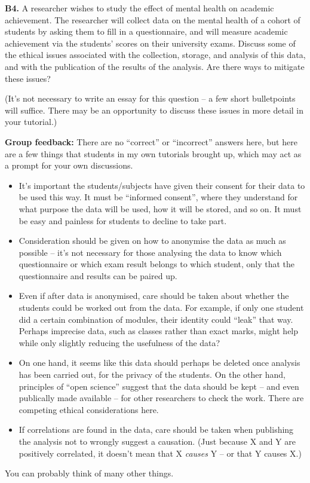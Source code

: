 \documentclass[
  a4paper,
]{book}
\providecommand{\tightlist}{%
  \setlength{\itemsep}{0pt}\setlength{\parskip}{0pt}}
\theoremstyle{definition}
\theoremstyle{definition}
\theoremstyle{definition}
\theoremstyle{definition}
\theoremstyle{remark}
\begin{document}
\textbf{B4.} A researcher wishes to study the effect of mental health on academic achievement. The researcher will collect data on the mental health of a cohort of students by asking them to fill in a questionnaire, and will measure academic achievement via the students' scores on their university exams. Discuss some of the ethical issues associated with the collection, storage, and analysis of this data, and with the publication of the results of the analysis. Are there ways to mitigate these issues?

(It's not necessary to write an essay for this question -- a few short bulletpoints will suffice. There may be an opportunity to discuss these issues in more detail in your tutorial.)

\begin{myanswers}
\textbf{Group feedback:} There are no ``correct'' or ``incorrect'' answers here, but here are a few things that students in my own tutorials brought up, which may act as a prompt for your own discussions.

\begin{itemize}
\tightlist
\item
  It's important the students/subjects have given their consent for their data to be used this way. It must be ``informed consent'', where they understand for what purpose the data will be used, how it will be stored, and so on. It must be easy and painless for students to decline to take part.
\item
  Consideration should be given on how to anonymise the data as much as possible -- it's not necessary for those analysing the data to know which questionnaire or which exam result belongs to which student, only that the questionnaire and results can be paired up.
\item
  Even if after data is anonymised, care should be taken about whether the students could be worked out from the data. For example, if only one student did a certain combination of modules, their identity could ``leak'' that way. Perhaps imprecise data, such as classes rather than exact marks, might help while only slightly reducing the usefulness of the data?
\item
  On one hand, it seems like this data should perhaps be deleted once analysis has been carried out, for the privacy of the students. On the other hand, principles of ``open science'' suggest that the data should be kept -- and even publically made available -- for other researchers to check the work. There are competing ethical considerations here.
\item
  If correlations are found in the data, care should be taken when publishing the analysis not to wrongly suggest a causation. (Just because X and Y are positively correlated, it doesn't mean that X \emph{causes} Y -- or that Y causes X.)
\end{itemize}

You can probably think of many other things.

\end{myanswers}
\end{document}
